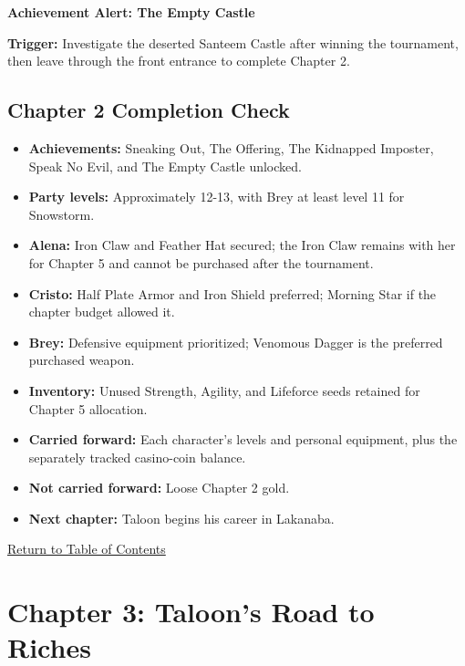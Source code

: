 \documentclass[
  american,
  10pt,
  letterpaper,
  oneside,
  open=any]{scrreprt}
\providecommand{\tightlist}{%
  \setlength{\itemsep}{0pt}\setlength{\parskip}{0pt}}
\begin{document}
\begin{achievementalert}

\textbf{Achievement Alert: The Empty Castle}

\textbf{Trigger:} Investigate the deserted Santeem Castle after winning
the tournament, then leave through the front entrance to complete
Chapter 2.

\end{achievementalert}

\section{Chapter 2 Completion Check}\label{chapter-2-completion-check}

\begin{itemize}
\tightlist
\item
  \textbf{Achievements:} Sneaking Out, The Offering, The Kidnapped
  Imposter, Speak No Evil, and The Empty Castle unlocked.
\item
  \textbf{Party levels:} Approximately 12-13, with Brey at least level
  11 for Snowstorm.
\item
  \textbf{Alena:} Iron Claw and Feather Hat secured; the Iron Claw
  remains with her for Chapter 5 and cannot be purchased after the
  tournament.
\item
  \textbf{Cristo:} Half Plate Armor and Iron Shield preferred; Morning
  Star if the chapter budget allowed it.
\item
  \textbf{Brey:} Defensive equipment prioritized; Venomous Dagger is the
  preferred purchased weapon.
\item
  \textbf{Inventory:} Unused Strength, Agility, and Lifeforce seeds
  retained for Chapter 5 allocation.
\item
  \textbf{Carried forward:} Each character's levels and personal
  equipment, plus the separately tracked casino-coin balance.
\item
  \textbf{Not carried forward:} Loose Chapter 2 gold.
\item
  \textbf{Next chapter:} Taloon begins his career in Lakanaba.
\end{itemize}

\hyperref[table-of-contents]{Return to Table of Contents}

\chapter{Chapter 3: Taloon's Road to
Riches}\label{chapter-3-taloons-road-to-riches}
\end{document}
